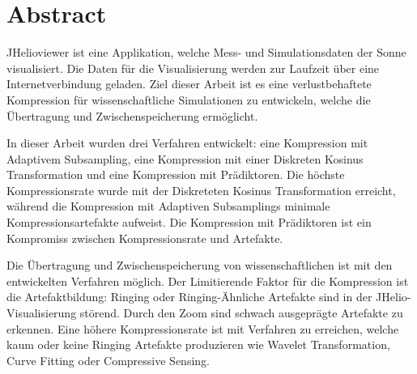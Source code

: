 \section*{Abstract}
JHelioviewer ist eine Applikation, welche Mess- und Simulationsdaten der Sonne visualisiert. Die Daten für die Visualisierung werden zur Laufzeit über eine Internetverbindung geladen. Ziel dieser Arbeit ist es eine verlustbehaftete Kompression für wissenschaftliche Simulationen zu entwickeln, welche die Übertragung und Zwischenspeicherung ermöglicht.

In dieser Arbeit wurden drei Verfahren entwickelt: eine Kompression mit Adaptivem Subsampling, eine Kompression mit einer Diskreten Kosinus Transformation und eine Kompression mit Prädiktoren. Die höchste Kompressionsrate wurde mit der Diskreteten Kosinus Transformation erreicht, während die Kompression mit Adaptiven Subsamplings minimale Kompressionsartefakte aufweist. Die Kompression mit Prädiktoren ist ein Kompromiss zwischen Kompressionsrate und Artefakte.

Die Übertragung und Zwischenspeicherung von wissenschaftlichen ist mit den entwickelten Verfahren möglich. Der Limitierende Faktor für die Kompression ist die Artefaktbildung: Ringing oder Ringing-Ähnliche Artefakte sind in der JHelio-Visualisierung störend. Durch den Zoom sind schwach ausgeprägte Artefakte zu erkennen. Eine höhere Kompressionsrate ist mit Verfahren zu erreichen, welche kaum oder keine Ringing Artefakte produzieren wie Wavelet Transformation, Curve Fitting oder Compressive Sensing.